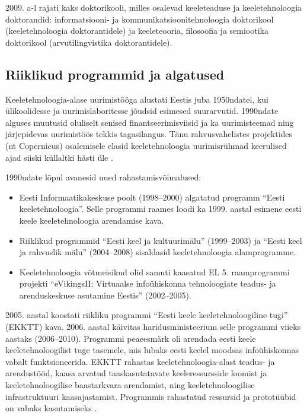 \documentclass[]{../metanetpaper}
\begin{document}
\begin{multicols}{2}
2009. a-l rajati kaks doktorikooli, milles osalevad keeleteaduse ja keele\-tehnoloogia doktorandid: informatsiooni- ja kommu\-ni\-kat\-siooni\-tehnoloogia doktorikool (keele\-tehnoloogia doktorantidele) ja keele\-teooria, filosoofia ja semiootika doktorikool (arvutilingvistika doktorantidele).

\subsection{Riiklikud programmid ja algatused}

Keeletehnoloogia-alase uurimistööga alustati Eestis juba 1950ndatel, kui ülikoolidesse ja uurimislaboritesse jõudsid esimesed suurarvutid. 
1990ndate alguses muutusid oluliselt senised finantseerimisviisid ja ka uurimisteemad ning järjepidevas uurimistöös tekkis tagasilangus. 
Tänu rahvusvahelistes projektides (nt Copernicus) osalemisele elasid keeletehnoloogia uurimisrühmad keerulised ajad siiski küllaltki hästi üle \cite{Meisteretal}.

1990ndate lõpul avanesid uued rahastamisvõimalused:
\begin{itemize}
 \item Eesti Informaatikakeskuse poolt (1998--2000) algatatud programm ``Eesti keeletehnoloogia''. Selle programmi raames loodi ka 1999. aastal esimene eesti keele keeletehnoloogia arendamise kava. 
 \item Riiklikud programmid ``Eesti keel ja kultuurimälu''
   (1999--2003) ja ``Eesti keel ja rahvuslik mälu'' (2004--2008)
   sisaldasid keeletehnoloogia alamprogramme. 
 \item Keeletehnoloogia võtmeisikud olid samuti kaasatud EL 5. raam\-prog\-rammi projekti ``eVikingsII: Virtuaalse infoühiskonna tehnoloogiate teadus- ja arenduskeskuse asutamine Eestis'' (2002--2005).
\end{itemize}

2005. aastal koostati riikliku programmi ``Eesti keele keeletehnoloogiline tugi'' (EKKTT) kava. 
2006. aastal käivitas haridusministeerium selle programmi viieks
aastaks (2006--2010).  
Programmi peaeesmärk oli arendada eesti keele keeletehnoloogilist tuge tasemele, mis lubaks eesti keelel moodsas infoühiskonnas vabalt funktsioneerida. 
EKKTT rahastas keeletehnoloogia-alast teadus- ja arendustööd, kaasa arvatud taaskasutatavate keeleressursside loomist ja keeletehnoloogilise baastarkvara arendamist, ning keeletehnoloogilise infrastruktuuri kaasajastamist. 
Programmis rahastatud ressursid ja prototüübid on vabaks kasutamiseks \cite{ekktt}.


\end{multicols}
\end{document}
